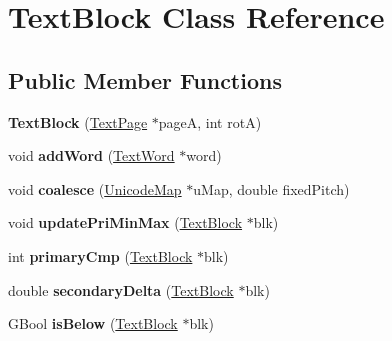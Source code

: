 \hypertarget{class_text_block}{}\section{Text\+Block Class Reference}
\label{class_text_block}
\subsection*{Public Member Functions}
\begin{DoxyCompactItemize}
\item 
\mbox{\label{class_text_block_a34bb2c2d5a1dd696b23168c36aa5f77b}} 
{\bfseries Text\+Block} (\hyperlink{class_text_page}{Text\+Page} $\ast$pageA, int rotA)
\item 
\mbox{\label{class_text_block_a990bc46513875cf5975b591454845192}} 
void {\bfseries add\+Word} (\hyperlink{class_text_word}{Text\+Word} $\ast$word)
\item 
\mbox{\label{class_text_block_af4e99ff9f6f1008ab39bde6f331fcad4}} 
void {\bfseries coalesce} (\hyperlink{class_unicode_map}{Unicode\+Map} $\ast$u\+Map, double fixed\+Pitch)
\item 
\mbox{\label{class_text_block_a8b315ccc591cceeca8ec3240d733eac4}} 
void {\bfseries update\+Pri\+Min\+Max} (\hyperlink{class_text_block}{Text\+Block} $\ast$blk)
\item 
\mbox{\label{class_text_block_af7296bb30966495efe96eabe81e5417e}} 
int {\bfseries primary\+Cmp} (\hyperlink{class_text_block}{Text\+Block} $\ast$blk)
\item 
\mbox{\label{class_text_block_a7295949ea3a29f05e0ecc0af0b6f8fa2}} 
double {\bfseries secondary\+Delta} (\hyperlink{class_text_block}{Text\+Block} $\ast$blk)
\item 
\mbox{\label{class_text_block_afdb43872e991ed30f983d17e0acc3e8a}} 
G\+Bool {\bfseries is\+Below} (\hyperlink{class_text_block}{Text\+Block} $\ast$blk)
\item 
\mbox{\label{class_text_block_ae03575a21e73758c3f21b9ad62008351}} 

\end{DoxyCompactItemize}
